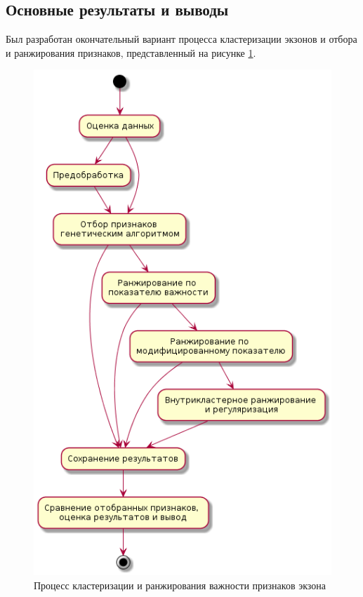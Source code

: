 \subsection{Основные результаты и выводы}
Был разработан окончательный вариант процесса кластеризации экзонов и отбора и ранжирования признаков, представленный на рисунке \ref{process}.
\begin{figure}[H]
\center
  \includegraphics[width=0.5\linewidth]{pics/process.png}
  \caption{Процесс кластеризации и ранжирования важности признаков экзона}
  \label{process}
\end{figure}